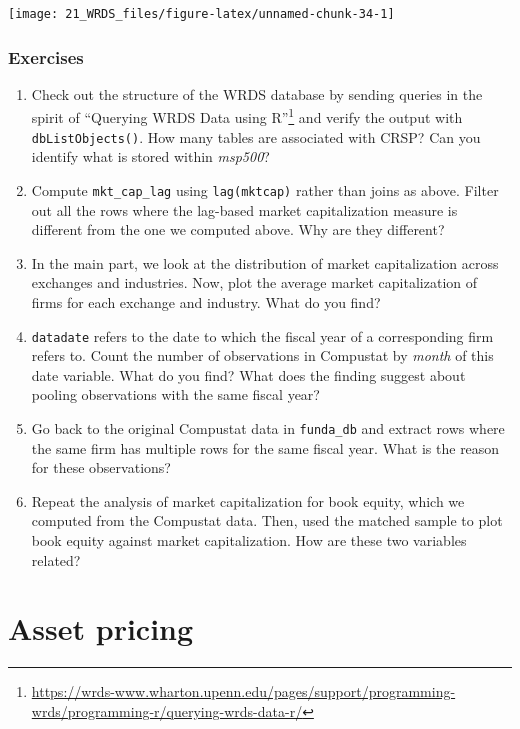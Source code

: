 \documentclass[
]{book}
\providecommand{\tightlist}{%
  \setlength{\itemsep}{0pt}\setlength{\parskip}{0pt}}
\renewcommand{\href}[2]{#2\footnote{\url{#1}}}
\begin{document}
\begin{center}\texttt{[image: 21\_WRDS\_files/figure-latex/unnamed-chunk-34-1]} \end{center}

\hypertarget{exercises-2}{%
\section{Exercises}\label{exercises-2}}

\begin{enumerate}
\def\labelenumi{\arabic{enumi}.}
\tightlist
\item
  Check out the structure of the WRDS database by sending queries in the spirit of \href{https://wrds-www.wharton.upenn.edu/pages/support/programming-wrds/programming-r/querying-wrds-data-r/}{``Querying WRDS Data using R''} and verify the output with \texttt{dbListObjects()}. How many tables are associated with CRSP? Can you identify what is stored within \emph{msp500}?
\item
  Compute \texttt{mkt\_cap\_lag} using \texttt{lag(mktcap)} rather than joins as above. Filter out all the rows where the lag-based market capitalization measure is different from the one we computed above. Why are they different?
\item
  In the main part, we look at the distribution of market capitalization across exchanges and industries. Now, plot the average market capitalization of firms for each exchange and industry. What do you find?
\item
  \texttt{datadate} refers to the date to which the fiscal year of a corresponding firm refers to. Count the number of observations in Compustat by \emph{month} of this date variable. What do you find? What does the finding suggest about pooling observations with the same fiscal year?
\item
  Go back to the original Compustat data in \texttt{funda\_db} and extract rows where the same firm has multiple rows for the same fiscal year. What is the reason for these observations?
\item
  Repeat the analysis of market capitalization for book equity, which we computed from the Compustat data. Then, used the matched sample to plot book equity against market capitalization. How are these two variables related?
\end{enumerate}

\hypertarget{part-asset-pricing}{%
\part*{Asset pricing}\label{part-asset-pricing}}
\end{document}
